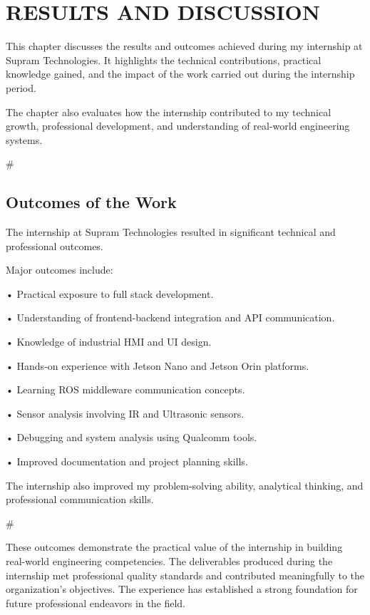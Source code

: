\documentclass[12pt,a4paper]{report}
\begin{document}
\chapter{RESULTS AND DISCUSSION}
\label{ch:results}


This chapter discusses the results and outcomes achieved during my internship at Supram Technologies. It highlights the technical contributions, practical knowledge gained, and the impact of the work carried out during the internship period.


The chapter also evaluates how the internship contributed to my technical growth, professional development, and understanding of real-world engineering systems.


\#




\section{Outcomes of the Work}

The internship at Supram Technologies resulted in significant technical and professional outcomes.


Major outcomes include:


• Practical exposure to full stack development.


• Understanding of frontend-backend integration and API communication.


• Knowledge of industrial HMI and UI design.


• Hands-on experience with Jetson Nano and Jetson Orin platforms.


• Learning ROS middleware communication concepts.


• Sensor analysis involving IR and Ultrasonic sensors.


• Debugging and system analysis using Qualcomm tools.


• Improved documentation and project planning skills.


The internship also improved my problem-solving ability, analytical thinking, and professional communication skills.


\#


These outcomes demonstrate the practical value of the internship in building real-world engineering competencies. The deliverables produced during the internship met professional quality standards and contributed meaningfully to the organization's objectives. The experience has established a strong foundation for future professional endeavors in the field.
\end{document}
